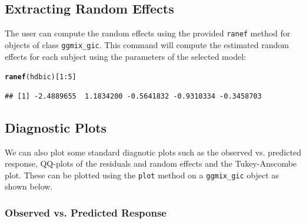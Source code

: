 \documentclass[12pt,letter]{article}\usepackage[]{graphicx}\usepackage[]{color}
\makeatletter
\newcommand{\hlnum}[1]{\textcolor[rgb]{0.686,0.059,0.569}{#1}}%
\newcommand{\hlopt}[1]{\textcolor[rgb]{0,0,0}{#1}}%
\newcommand{\hlstd}[1]{\textcolor[rgb]{0.345,0.345,0.345}{#1}}%
\newcommand{\hlkwd}[1]{\textcolor[rgb]{0.737,0.353,0.396}{\textbf{#1}}}%
\newenvironment{kframe}{%
 \def\at@end@of@kframe{}%
 \ifinner\ifhmode%
  \def\at@end@of@kframe{\end{minipage}}%
  \begin{minipage}{\columnwidth}%
 \fi\fi%
 \def\FrameCommand##1{\hskip\@totalleftmargin \hskip-\fboxsep
 \colorbox{shadecolor}{##1}\hskip-\fboxsep
     \hskip-\linewidth \hskip-\@totalleftmargin \hskip\columnwidth}%
 \MakeFramed {\advance\hsize-\width
   \@totalleftmargin\z@ \linewidth\hsize
   \@setminipage}}%
 {\par\unskip\endMakeFramed%
 \at@end@of@kframe}
\newenvironment{knitrout}{}{} %
\makeatother
\begin{document}
\subsection{Extracting Random Effects}

The user can compute the random effects using the provided \texttt{ranef} method for objects of class \texttt{ggmix\_gic}. This command will compute the estimated random effects for each subject using the parameters of the selected model:

\begin{knitrout}\scriptsize
{}\color{fgcolor}\begin{kframe}
\begin{alltt}
\hlkwd{ranef}\hlstd{(hdbic)[}\hlnum{1}\hlopt{:}\hlnum{5}\hlstd{]}
\end{alltt}
\begin{verbatim}
## [1] -2.4889655  1.1834200 -0.5641832 -0.9310334 -0.3458703
\end{verbatim}
\end{kframe}
\end{knitrout}



\subsection{Diagnostic Plots}

We can also plot some standard diagnotic plots such as the observed vs. predicted response, QQ-plots of the residuals and random effects and the Tukey-Anscombe plot. These can be plotted using the \texttt{plot} method on a \texttt{ggmix\_gic} object as shown below.


\subsubsection{Observed vs. Predicted Response}
\end{document}

